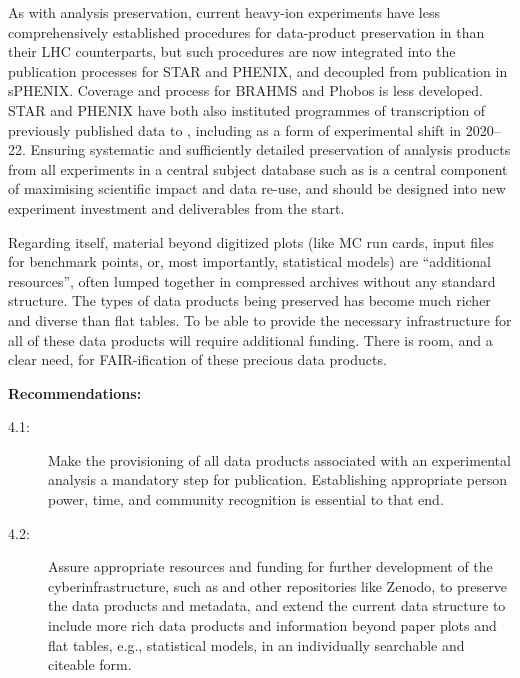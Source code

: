 \documentclass[11pt]{article}
\begin{document}
As with \gls{analysis preservation}, current heavy-ion experiments have less comprehensively established procedures for data-product preservation in \hepdata than their \gls{LHC} counterparts, but such procedures are now integrated into the publication processes for \gls{STAR} and \gls{PHENIX}, and decoupled from publication in \gls{sPHENIX}. Coverage and process for BRAHMS and Phobos is less developed. \gls{STAR} and \gls{PHENIX} have both also instituted programmes of transcription of previously published data to \hepdata, including as a form of experimental shift in 2020--22. Ensuring systematic and sufficiently detailed preservation of analysis products from all experiments in a central subject database such as \hepdata is a central component of maximising scientific impact and data re-use, and should be designed into new experiment investment and deliverables from the start. 

Regarding \hepdata itself, material beyond digitized plots (like MC run cards, input files for benchmark points, or, most importantly, statistical models) are ``additional resources'', often lumped together in compressed archives without any standard structure.
The types of data products being preserved has become much richer and diverse than flat tables.
To be able to provide the necessary infrastructure for all of these data products will require additional funding.
There is room, and a clear need, for \gls{FAIR}-ification of these precious data products. 

\noindent
\textbf{Recommendations:}
\begin{description}
   \item[4.1:] Make the provisioning of all \glspl{data product} associated with an experimental analysis a mandatory step for publication.
   Establishing appropriate person power, time, and community recognition is essential to that end.
   \item[4.2:] Assure appropriate resources and funding for further development of the cyberinfrastructure, such as \hepdata and other repositories like Zenodo, to preserve the data products and metadata, and extend the current data structure to include more rich data products and information beyond paper plots and flat tables, e.g., statistical models, in an individually searchable and citeable form.
\end{description}





\end{document}
